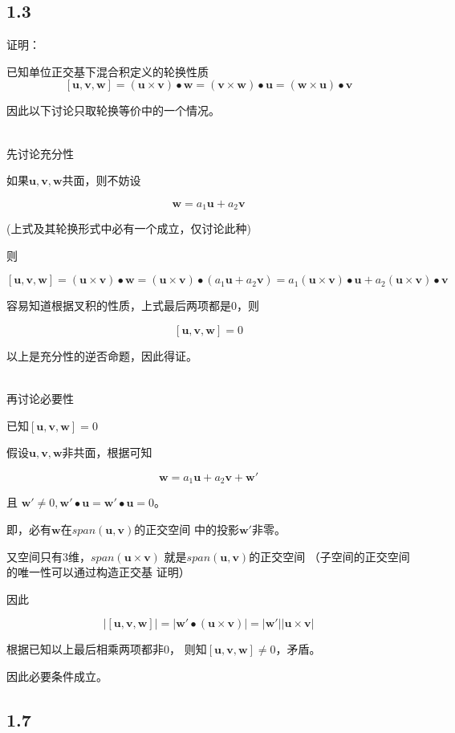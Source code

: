 \documentclass[UTF8,zihao=5]{ctexart}
\begin{document}
\subsection*{1.3}
证明：

已知单位正交基下混合积定义的轮换性质
$$
[\bm{u},\bm{v},\bm{w}]=
(\bm{u}\times\bm{v})\bullet\bm{w}
=(\bm{v}\times\bm{w})\bullet\bm{u}
=(\bm{w}\times\bm{u})\bullet\bm{v}
$$

因此以下讨论只取轮换等价中的一个情况。

~\\

先讨论充分性

如果$\bm{u},\bm{v},\bm{w}$共面，则不妨设

$$
\bm{w}=a_1\bm{u}+a_2\bm{v}
$$

(上式及其轮换形式中必有一个成立，仅讨论此种)

则

$$
[\bm{u},\bm{v},\bm{w}]=
(\bm{u}\times\bm{v})\bullet\bm{w}
=(\bm{u}\times\bm{v})\bullet(a_1\bm{u}+a_2\bm{v})
=a_1(\bm{u}\times\bm{v})\bullet\bm{u}+
a_2(\bm{u}\times\bm{v})\bullet\bm{v}
$$

容易知道根据叉积的性质，上式最后两项都是0，则

$$
[\bm{u},\bm{v},\bm{w}]=0
$$

以上是充分性的逆否命题，因此得证。

~\\

再讨论必要性

已知$[\bm{u},\bm{v},\bm{w}]=0$

假设$\bm{u},\bm{v},\bm{w}$非共面，根据可知

$$
\bm{w}=a_1\bm{u}+a_2\bm{v}+\bm{w'}
$$

且
$
\bm{w'}\neq 0, 
\bm{w'}\bullet\bm{u}=\bm{w'}\bullet\bm{u}=0
$。

即，必有$\bm{w}$在$span(\bm{u},\bm{v})$的正交空间
中的投影$\bm{w'}$非零。

又空间只有3维，$span(\bm{u}\times\bm{v})$
就是$span(\bm{u},\bm{v})$的正交空间
（子空间的正交空间的唯一性可以通过构造正交基
证明）

因此

$$
\left|[\bm{u},\bm{v},\bm{w}]\right|
=\left|\bm{w'}\bullet(\bm{u}\times\bm{v})\right|
=|\bm{w'}||\bm{u}\times\bm{v}|
$$

根据已知以上最后相乘两项都非0，
则知$[\bm{u},\bm{v},\bm{w}]\neq 0$，矛盾。

因此必要条件成立。

\subsection*{1.7}
\end{document}
